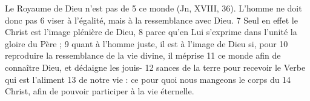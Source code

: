 Le Royaume de Dieu n'est pas de	 
5	 	ce monde (Jn, XVIII, 36). L'homme ne doit donc pas	 
6	 	viser à l'égalité, mais à la ressemblance avec Dieu.	 
7	 	Seul en effet le Christ est l'image plénière de Dieu,	 
8	 	parce qu'en Lui s'exprime dans l'unité la gloire du Père ;	 
9	 	quant à l'homme juste, il est à l'image de Dieu si, pour	 
10	 	reproduire la ressemblance de la vie divine, il méprise	 
11	 	ce monde afin de connaître Dieu, et dédaigne les jouis-	 
12	 	sances de la terre pour recevoir le Verbe qui est l'aliment	 
13	 	de notre vie : ce pour quoi nous mangeons le corps du	 
14	 	Christ, afin de pouvoir participer à la vie éternelle.